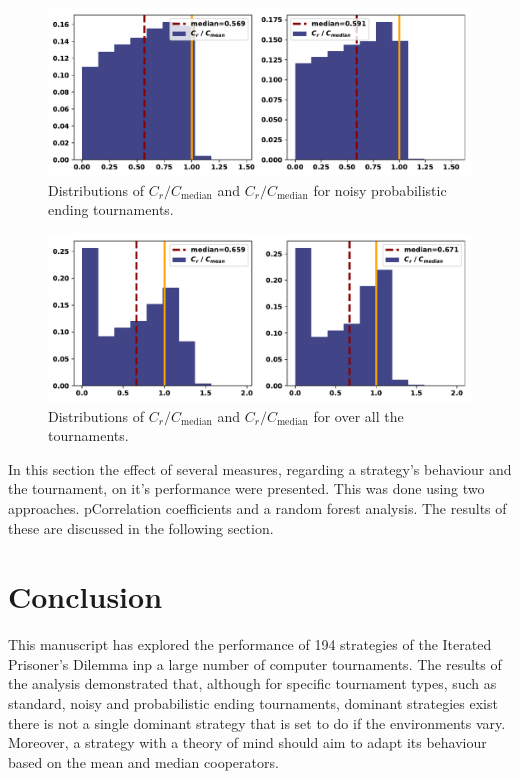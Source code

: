 \documentclass{article}
\begin{document}
\begin{figure}[!htbp]
    \centering
    \includegraphics[width=.5\textwidth]{../images/compared_to_mean_median_probend_noisy.pdf}
    \caption{Distributions of \(C_r / C_{\text{median}}\)
    and \(C_r / C_{\text{median}}\) for noisy probabilistic ending tournaments.}\label{fig:mean_median_probend_noisy}
\end{figure}

\begin{figure}[!htbp]
    \centering
    \includegraphics[width=.5\textwidth]{../images/compared_to_mean_median_overall.pdf}
    \caption{Distributions of \(C_r / C_{\text{median}}\)
    and \(C_r / C_{\text{median}}\) for over all the tournaments.}\label{fig:mean_median_overall}
\end{figure}

In this section the effect of several measures, regarding a strategy's behaviour
and the tournament, on it's performance were presented. This was done using
two approaches. pCorrelation coefficients and a random forest
analysis. The results of these are discussed in the following section.

\section{Conclusion}\label{section:conclusion}

This manuscript has explored the performance of 194 strategies of the Iterated
Prisoner's Dilemma inp a large number of computer tournaments. The results of
the analysis demonstrated that, although for specific tournament types, such as
standard, noisy and probabilistic ending tournaments, dominant strategies exist
there is not a single dominant strategy that is set to do if the environments
vary. Moreover, a strategy with a theory of mind should aim to adapt its behaviour
based on the mean and median cooperators.
\end{document}
